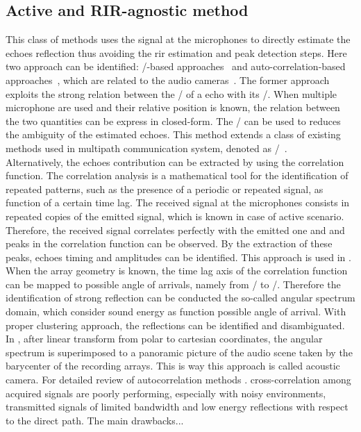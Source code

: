 \subsection{Active and RIR-agnostic method}
This class of methods uses the signal at the microphones to directly estimate the echoes reflection thus avoiding the rir estimation and peak detection steps.
Here two approach can be identified: \ML/-based approaches~ and auto-correlation-based approaches~, which are related to the audio cameras~.
The former approach exploits the strong relation between the \TOA/ of a echo with its \DOA/.
When multiple microphone are used and their relative position is known, the relation between the two quantities can be express in closed-form.
The \DOA/ can be used to reduces the ambiguity of the estimated echoes.
This method extends a class of existing methods used in multipath communication system, denoted as \JADE/~.
\\Alternatively, the echoes contribution can be extracted by using the correlation function.
The correlation analysis is a mathematical tool for the identification of repeated patterns, such as the presence of a periodic or repeated signal, as function of a certain time lag.
The received signal at the microphones consists in repeated copies of the emitted signal, which is known in case of active scenario.
Therefore, the received signal correlates perfectly with the emitted one and and peaks in the correlation function can be observed.
By the extraction of these peaks, echoes timing and amplitudes can be identified.
This approach is used in .
\\When the array geometry is known, the time lag axis of the correlation function can be mapped to possible angle of arrivals, namely from \TOAs/ to \DOAs/.
Therefore the identification of strong reflection can be conducted the so-called angular spectrum domain, which consider sound energy as function possible angle of arrival.
With proper clustering approach, the reflections can be identified and disambiguated.
In , after linear transform from polar to cartesian coordinates, the angular spectrum is superimposed to a panoramic picture of the audio scene taken by the barycenter of the recording arrays.
This is way this approach is called acoustic camera.
For detailed review of autocorrelation methods .
cross-correlation among acquired signals are poorly performing, especially with noisy environments, transmitted signals of limited bandwidth and low energy reflections with respect to the direct path.
The main drawbacks...

